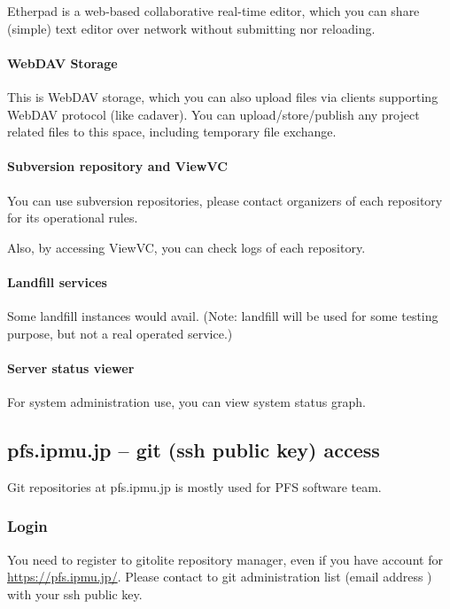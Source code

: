 \documentclass[a4paper,notitlepage]{article}
\begin{document}
Etherpad is a web-based collaborative real-time editor, 
which you can share (simple) text editor over network without submitting 
nor reloading. 

\paragraph{WebDAV Storage}

This is WebDAV storage, which you can also upload files via clients 
supporting WebDAV protocol (like cadaver). 
You can upload/store/publish any project related files to this space, 
including temporary file exchange. 

\paragraph{Subversion repository and ViewVC}

You can use subversion repositories, please contact organizers of each 
repository for its operational rules. 

Also, by accessing ViewVC, you can check logs of each repository. 

\paragraph{Landfill services}

Some landfill instances would avail. 
(Note: landfill will be used for some testing purpose, but not a real 
operated service.) 

\paragraph{Server status viewer}

For system administration use, you can view system status graph.

\subsection{pfs.ipmu.jp -- git (ssh public key) access}

Git repositories at pfs.ipmu.jp is mostly used for PFS software team.

\subsubsection{Login}

You need to register to gitolite repository manager, even if you have account 
for \url{https://pfs.ipmu.jp/}. Please contact to git administration list 
(email address \tbd) with your ssh public key.
\end{document}
